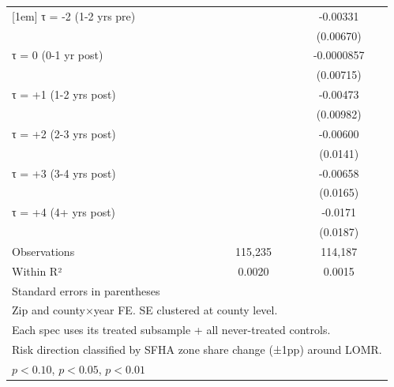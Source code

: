 \begin{table}[htbp]
\begin{tabular}{l*{2}{c}}
[1em]
τ = -2 (1-2 yrs pre)&                     &    -0.00331         \\
                    &                     &   (0.00670)         \\
[1em]
τ = 0 (0-1 yr post) &                     &  -0.0000857         \\
                    &                     &   (0.00715)         \\
[1em]
τ = +1 (1-2 yrs post)&                     &    -0.00473         \\
                    &                     &   (0.00982)         \\
[1em]
τ = +2 (2-3 yrs post)&                     &    -0.00600         \\
                    &                     &    (0.0141)         \\
[1em]
τ = +3 (3-4 yrs post)&                     &    -0.00658         \\
                    &                     &    (0.0165)         \\
[1em]
τ = +4 (4+ yrs post)&                     &     -0.0171         \\
                    &                     &    (0.0187)         \\
\hline
Observations        &     115,235         &     114,187         \\
Within R²           &      0.0020         &      0.0015         \\
\hline\hline
\multicolumn{3}{l}{\footnotesize Standard errors in parentheses}\\
\multicolumn{3}{l}{\footnotesize Zip and county×year FE. SE clustered at county level.}\\
\multicolumn{3}{l}{\footnotesize Each spec uses its treated subsample + all never-treated controls.}\\
\multicolumn{3}{l}{\footnotesize Risk direction classified by SFHA zone share change (±1pp) around LOMR.}\\
\multicolumn{3}{l}{\footnotesize \sym{*} \(p<0.10\), \sym{**} \(p<0.05\), \sym{***} \(p<0.01\)}\\
\end{tabular}
\end{table}
